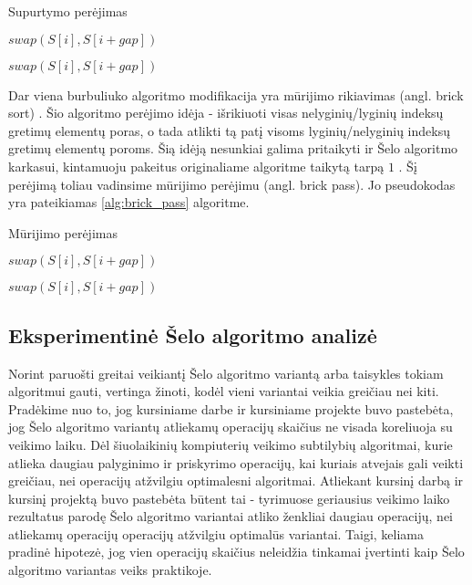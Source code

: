 \documentclass{VUMIFInfBakalaurinis}
\begin{document}
\begin{algorithm}[H]
  \caption{Supurtymo perėjimas}\label{alg:shake_pass}
  \begin{algorithmic}[1]
        \State $swap(S[i], S[i+gap])$
      \EndIf
    \EndFor

        \State $swap(S[i], S[i+gap])$
      \EndIf
    \EndFor
  \end{algorithmic}
\end{algorithm}

Dar viena burbuliuko algoritmo modifikacija yra mūrijimo rikiavimas (angl. brick sort) \cite{habermann1972parallel}.
Šio algoritmo perėjimo idėja - išrikiuoti visas nelyginių/lyginių indeksų gretimų elementų poras,
o tada atlikti tą patį visoms lyginių/nelyginių indeksų gretimų elementų poroms.
Šią idėją nesunkiai galima pritaikyti ir Šelo algoritmo karkasui, kintamuoju pakeitus originaliame algoritme taikytą tarpą $1$ \cite{lemke1994performance}.
Šį perėjimą toliau vadinsime mūrijimo perėjimu (angl. brick pass).
Jo pseudokodas yra pateikiamas \ref{alg:brick_pass} algoritme.

\begin{algorithm}[H]
  \caption{Mūrijimo perėjimas}\label{alg:brick_pass}
  \begin{algorithmic}[1]
        \State $swap(S[i], S[i+gap])$
      \EndIf
    \EndFor

        \State $swap(S[i], S[i+gap])$
      \EndIf
    \EndFor
  \end{algorithmic}
\end{algorithm}

\subsection{Eksperimentinė Šelo algoritmo analizė}

Norint paruošti greitai veikiantį Šelo algoritmo variantą arba taisykles tokiam algoritmui gauti, vertinga žinoti, kodėl vieni variantai veikia greičiau nei kiti.
Pradėkime nuo to, jog kursiniame darbe ir kursiniame projekte buvo pastebėta, jog Šelo algoritmo variantų atliekamų operacijų skaičius ne visada koreliuoja su veikimo laiku.
Dėl šiuolaikinių kompiuterių veikimo subtilybių algoritmai, kurie atlieka daugiau palyginimo ir priskyrimo operacijų,
kai kuriais atvejais gali veikti greičiau, nei operacijų atžvilgiu optimalesni algoritmai.
Atliekant kursinį darbą ir kursinį projektą buvo pastebėta būtent tai - 
tyrimuose geriausius veikimo laiko rezultatus parodę Šelo algoritmo variantai atliko ženkliai daugiau operacijų, nei atliekamų operacijų operacijų atžvilgiu optimalūs variantai.
Taigi, keliama pradinė hipotezė, jog vien operacijų skaičius neleidžia tinkamai įvertinti kaip Šelo algoritmo variantas veiks praktikoje.
\end{document}
